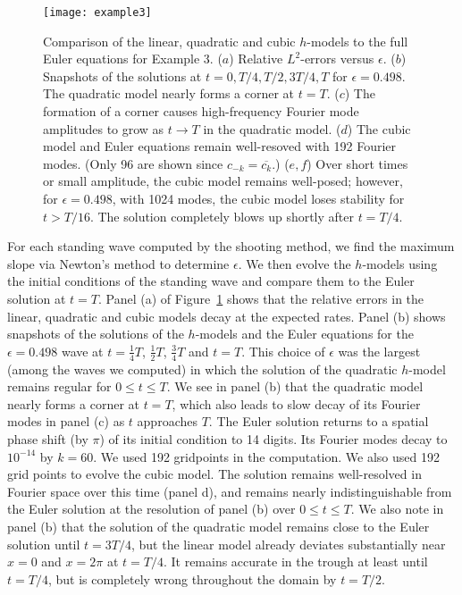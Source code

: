 \documentclass[11pt]{article}
\theoremstyle{plain}
\theoremstyle{definition}
\theoremstyle{definition}
\newcommand{\eps}{\epsilon}
\begin{document}
\begin{figure}[p]
  \begin{center}
\texttt{[image: example3]}
\caption{\label{fig:ex3} Comparison of the linear, quadratic and cubic
  $h$-models to the full Euler equations for Example 3. ($a$) Relative
  $L^2$-errors versus $\eps$. ($b$) Snapshots of the solutions at
  $t=0,T/4,T/2,3T/4,T$ for $\eps=0.498$. The quadratic model nearly
  forms a corner at $t=T$. ($c$) The formation of a corner causes
  high-frequency Fourier mode amplitudes to grow as $t\rightarrow T$
  in the quadratic model. ($d$) The cubic model and Euler equations
  remain well-resoved with 192 Fourier modes. (Only 96 are shown since
    $c_{-k}=\overline{c_k}$.)  ($e,f$) Over short times or small
  amplitude, the cubic model remains well-posed; however, for
  $\eps=0.498$, with 1024 modes, the cubic model loses stability for
  $t>T/16$. The solution completely blows up shortly after $t=T/4$.}
\end{center}
\end{figure}

For each standing wave computed by the shooting method, we find the
maximum slope via Newton's method to determine $\eps$. We then evolve
the $h$-models using the initial conditions of the standing wave and
compare them to the Euler solution at $t=T$. Panel (a) of
Figure~\ref{fig:ex3} shows that the relative errors in the linear,
quadratic and cubic models decay at the expected rates.
Panel (b) shows snapshots of the solutions of the $h$-models and the
Euler equations for the $\eps=0.498$ wave at $t=\frac14T$, $\frac12T$,
$\frac34T$ and $t=T$. This choice of $\eps$ was the largest (among the
  waves we computed) in which the solution of the quadratic $h$-model
remains regular for $0\le t\le T$. We see in panel (b) that the
quadratic model nearly forms a corner at $t=T$, which also leads to
slow decay of its Fourier modes in panel (c) as $t$ approaches
$T$. The Euler solution returns to a spatial phase shift (by $\pi$) of
its initial condition to 14 digits. Its Fourier modes decay to
$10^{-14}$ by $k=60$. We used 192 gridpoints in the computation.  We
also used 192 grid points to evolve the cubic model. The solution
remains well-resolved in Fourier space over this time (panel d), and
remains nearly indistinguishable from the Euler solution at the
resolution of panel (b) over $0\le t\le T$. We also note in panel (b)
that the solution of the quadratic model remains close to the Euler
solution until $t=3T/4$, but the linear model already deviates
substantially near $x=0$ and $x=2\pi$ at $t=T/4$. It remains accurate
in the trough at least until $t=T/4$, but is completely wrong
throughout the domain by $t=T/2$.
\end{document}
